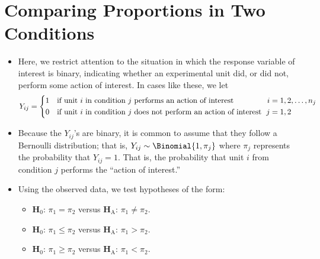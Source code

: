 \section{Comparing Proportions in Two Conditions}
\begin{itemize}
    \item Here, we restrict attention to the situation in which the response variable of interest
          is binary, indicating whether an experimental unit did, or did not, perform
          some action of interest. In cases like these, we let
          \[ Y_{ij}=\begin{cases*}
                  1 & if unit $ i $ in condition $ j $ performs an action of interest         \\
                  0 & if unit $ i $ in condition $ j $ does not perform an action of interest
              \end{cases*}\begin{aligned}
                  i & =1,2,\ldots,n_j \\
                  j & =1,2
              \end{aligned} \]
    \item Because the $ Y_{ij} $'s are binary, it is common to assume that they follow
          a Bernoulli distribution; that is, $ Y_{ij}\sim \Binomial{1,\pi_j} $ where
          $ \pi_j $ represents the probability that $ Y_{ij}=1 $. That is,
          the probability that unit $ i $ from condition $ j $ performs the ``action of interest.''
    \item Using the observed data, we test hypotheses of the form:
          \begin{itemize}
              \item $ \mathbf{H}_0 $: $ \pi_1=\pi_2 $ versus $ \mathbf{H}_\text{A} $: $ \pi_1\ne\pi_2 $.
              \item $ \mathbf{H}_0 $: $ \pi_1\le\pi_2 $ versus $ \mathbf{H}_\text{A} $: $ \pi_1>\pi_2 $.
              \item $ \mathbf{H}_0 $: $ \pi_1\ge\pi_2 $ versus $ \mathbf{H}_\text{A} $: $ \pi_1<\pi_2 $.
          \end{itemize}
\end{itemize}
